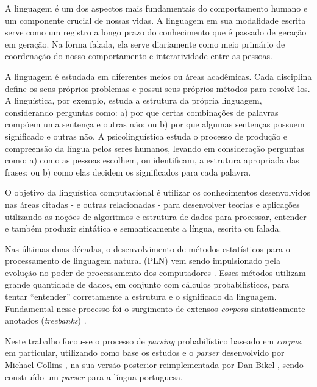 A linguagem é um dos aspectos mais fundamentais do comportamento humano e um componente crucial de nossas vidas. A linguagem em sua modalidade escrita serve como um registro a longo prazo do conhecimento que é passado de geração em geração. Na forma falada, ela serve diariamente como meio primário de coordenação do nosso comportamento e interatividade entre as pessoas.

A linguagem  é estudada em diferentes meios ou áreas acadêmicas. Cada disciplina define os seus próprios problemas e possui seus próprios métodos para resolvê-los. A linguística, por exemplo, estuda a estrutura da própria linguagem, considerando perguntas como: a) por que certas combinações de palavras compõem uma sentença e outras não; ou b) por que algumas sentenças possuem significado e outras não. A psicolinguística estuda o processo de produção e compreensão da língua pelos seres humanos, levando em consideração perguntas como: a) como as pessoas escolhem, ou identificam, a estrutura apropriada das frases; ou b) como elas decidem os significados para cada palavra.

O objetivo da linguística computacional é utilizar os conhecimentos desenvolvidos nas áreas citadas - e outras relacionadas - para desenvolver teorias e aplicações utilizando as noções de algoritmos e estrutura de dados para processar, entender e também produzir sintática e semanticamente a língua, escrita ou falada.

Nas últimas duas décadas, o desenvolvimento de métodos estatísticos para o processamento de linguagem natural (PLN) vem sendo impulsionado pela evolução no poder de processamento dos computadores \cite{manning99, jurafsky}. Esses métodos utilizam grande quantidade de dados, em conjunto com cálculos probabilísticos, para tentar ``entender'' corretamente a estrutura e o significado da linguagem. Fundamental nesse processo foi o surgimento de extensos \emph{corpora} sintaticamente anotados (\emph{treebanks}) \cite{marcus93,marcus94,abeille03,sardinha04}.

Neste trabalho focou-se o processo de \emph{parsing} probabilístico baseado em \emph{corpus}, em particular, utilizando como base os estudos e o \emph{parser} desenvolvido por Michael Collins \cite{collins99,collins97}, na sua versão posterior reimplementada por Dan Bikel \cite{bikel04}, sendo construído um \emph{parser} para a língua portuguesa.



